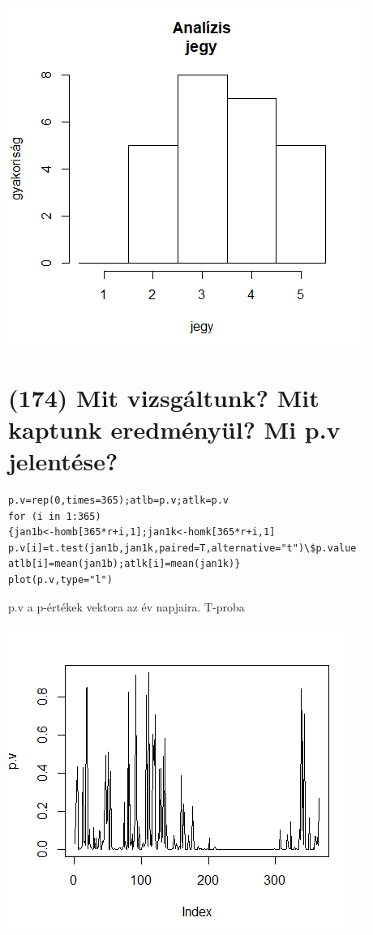 \documentclass[12p]{article}
\begin{document}
\includegraphics{histogram}

\section{(174)  Mit vizsgáltunk? Mit kaptunk eredményül? Mi p.v jelentése?}

\begin{verbatim}
p.v=rep(0,times=365);atlb=p.v;atlk=p.v
for (i in 1:365)
{jan1b<-homb[365*r+i,1];jan1k<-homk[365*r+i,1]
p.v[i]=t.test(jan1b,jan1k,paired=T,alternative="t")\$p.value
atlb[i]=mean(jan1b);atlk[i]=mean(jan1k)}
plot(p.v,type="l")
\end{verbatim}

p.v a p-értékek vektora az év napjaira. T-proba

\includegraphics{pv}
\end{document}
